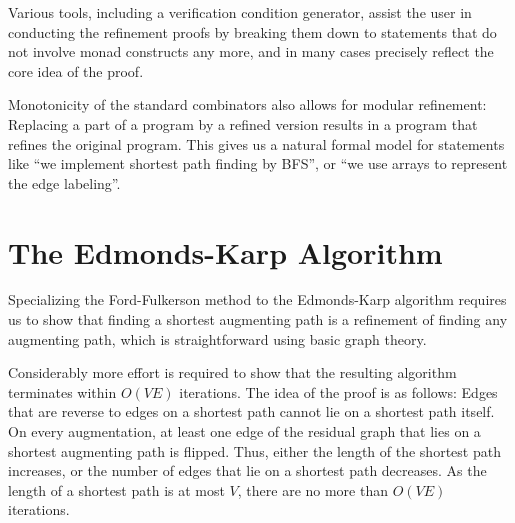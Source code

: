 \documentclass{llncs}
\begin{document}
Various tools, including a verification condition generator, assist the user in conducting the refinement proofs by breaking 
them down to statements that do not involve monad constructs any more, and in many cases precisely reflect the core idea of the proof.

Monotonicity of the standard combinators also allows for modular refinement: Replacing a part of a program by a refined version
results in a program that refines the original program. This gives us a natural formal model for statements like ``we implement shortest path finding by BFS'', or ``we use arrays to represent the edge labeling''. 

% 
% 
% 
% 
% 
% 
% 
% 




\section{The Edmonds-Karp Algorithm}\label{sec:edka}
  Specializing the Ford-Fulkerson method to the Edmonds-Karp algorithm requires us to show that finding a shortest augmenting path is a refinement of finding any augmenting path, which is straightforward using basic graph theory.
  
  Considerably more effort is required to show that the resulting algorithm terminates within $O(VE)$ iterations. 
  The idea of the proof is as follows: Edges that are reverse to edges on a shortest path cannot lie 
  on a shortest path itself.
  On every augmentation, at least one edge of the residual graph that lies on a shortest augmenting path is flipped. Thus, either the length of the shortest path increases,
  or the number of edges that lie on a shortest path decreases. As the length of a shortest path is at most $V$, there are no more than $O(VE)$ iterations.
  
\end{document}

